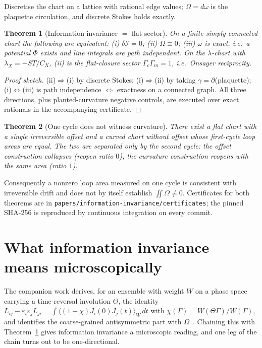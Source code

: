 \documentclass[aps,prd,twocolumn,superscriptaddress,nofootinbib]{revtex4-2}
\newcommand{\cI}{\mathcal{I}}
\newtheorem{theorem}{Theorem}
\begin{document}
Discretise the chart on a lattice with rational edge values; $\Omega=d\omega$ is
the plaquette circulation, and discrete Stokes holds exactly.

\begin{theorem}[Information invariance $=$ flat sector]\label{thm:A}
On a finite simply connected chart the following are equivalent:
(i) $\delta\cI=0$; (ii) $\Omega\equiv0$; (iii) $\omega$ is exact, i.e.\ a
potential $\Phi$ exists and line integrals are path independent. On the
$\lambda$-chart with $\lambda_X=-ST/C_X$, (ii) is the flat-closure sector
$\Gamma_c\Gamma_m=1$, i.e.\ Onsager reciprocity.
\end{theorem}

\begin{proof}[Proof sketch]
(ii)$\Rightarrow$(i) by discrete Stokes; (i)$\Rightarrow$(ii) by taking
$\gamma=\partial$(plaquette); (i)$\Leftrightarrow$(iii) is path independence
$\Leftrightarrow$ exactness on a connected graph. All three directions, plus
planted-curvature negative controls, are executed over exact rationals in the
accompanying certificate.
\end{proof}

\begin{theorem}[One cycle does not witness curvature]\label{thm:B}
There exist a flat chart with a single irreversible offset and a curved chart
without offset whose first-cycle loop areas are equal. The two are separated
only by the second cycle: the offset construction collapses (reopen ratio $0$),
the curvature construction reopens with the same area (ratio $1$).
\end{theorem}

Consequently a nonzero loop area measured on one cycle is consistent with
irreversible drift and does not by itself establish $\iint\Omega\neq0$.
Certificates for both theorems are in
\texttt{papers/information-invariance/certificates}; the pinned SHA-256 is
reproduced by continuous integration on every commit.

\section{What information invariance means microscopically}\label{sec:micro}

The companion work derives, for an ensemble with weight $W$ on a phase space
carrying a time-reversal involution $\Theta$, the identity
$L_{ij}-\varepsilon_i\varepsilon_jL_{ji}=\int\langle(1-\chi)J_i(0)J_j(t)\rangle_W\,dt$
with $\chi(\Gamma)=W(\Theta\Gamma)/W(\Gamma)$, and identifies the coarse-grained
antisymmetric part with $\Omega$~\cite{Dabas2026}. Chaining this with
Theorem~\ref{thm:A} gives information invariance a microscopic reading, and one
leg of the chain turns out to be one-directional.
\end{document}
